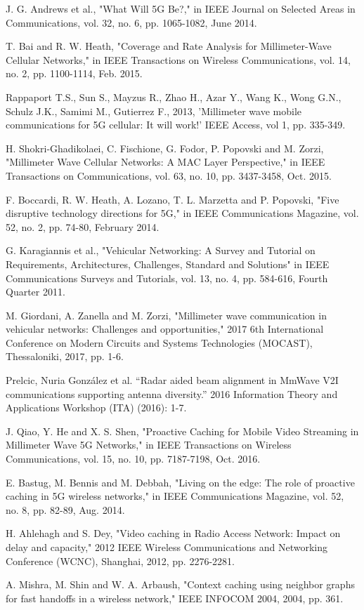 \documentclass[conference,10pt]{IEEEtran}
\begin{document}

\begin{thebibliography}{10}
\bibitem[1]{}
J. G. Andrews et al., "What Will 5G Be?," in IEEE Journal on Selected Areas in Communications, vol. 32, no. 6, pp. 1065-1082, June 2014.

\bibitem[2]{}
T. Bai and R. W. Heath, "Coverage and Rate Analysis for Millimeter-Wave Cellular Networks," in IEEE Transactions on Wireless Communications, vol. 14, no. 2, pp. 1100-1114, Feb. 2015.

\bibitem[3]{}
Rappaport T.S., Sun S., Mayzus R., Zhao H., Azar Y., Wang K., Wong G.N., Schulz J.K., Samimi M., Gutierrez F., 2013, 'Millimeter wave mobile communications for 5G cellular: It will work!' IEEE Access, vol 1, pp. 335-349.

\bibitem[4]{}
H. Shokri-Ghadikolaei, C. Fischione, G. Fodor, P. Popovski and M. Zorzi, "Millimeter Wave Cellular Networks: A MAC Layer Perspective," in IEEE Transactions on Communications, vol. 63, no. 10, pp. 3437-3458, Oct. 2015.

\bibitem[5]{}
F. Boccardi, R. W. Heath, A. Lozano, T. L. Marzetta and P. Popovski, "Five disruptive technology directions for 5G," in IEEE Communications Magazine, vol. 52, no. 2, pp. 74-80, February 2014.

\bibitem[6]{}
G. Karagiannis et al., "Vehicular Networking: A Survey and Tutorial on Requirements, Architectures, Challenges, Standard and Solutions" in IEEE Communications Surveys and Tutorials, vol. 13, no. 4, pp. 584-616, Fourth Quarter 2011.

\bibitem[7]{}
M. Giordani, A. Zanella and M. Zorzi, "Millimeter wave communication in vehicular networks: Challenges and opportunities," 2017 6th International Conference on Modern Circuits and Systems Technologies (MOCAST), Thessaloniki, 2017, pp. 1-6.

\bibitem[8]{}
Prelcic, Nuria González et al. “Radar aided beam alignment in MmWave V2I communications supporting antenna diversity.” 2016 Information Theory and Applications Workshop (ITA) (2016): 1-7.

\bibitem[9]{}
J. Qiao, Y. He and X. S. Shen, "Proactive Caching for Mobile Video Streaming in Millimeter Wave 5G Networks," in IEEE Transactions on Wireless Communications, vol. 15, no. 10, pp. 7187-7198, Oct. 2016.

\bibitem[10]{}
E. Bastug, M. Bennis and M. Debbah, "Living on the edge: The role of proactive caching in 5G wireless networks," in IEEE Communications Magazine, vol. 52, no. 8, pp. 82-89, Aug. 2014.

\bibitem[11]{}
H. Ahlehagh and S. Dey, "Video caching in Radio Access Network: Impact on delay and capacity," 2012 IEEE Wireless Communications and Networking Conference (WCNC), Shanghai, 2012, pp. 2276-2281.

\bibitem[12]{}
A. Mishra, M. Shin and W. A. Arbaush, "Context caching using neighbor graphs for fast handoffs in a wireless network," IEEE INFOCOM 2004, 2004, pp. 361.


\end{thebibliography}
\end{document}
